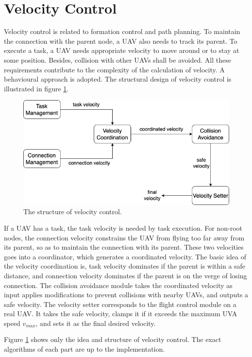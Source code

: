 \section{Velocity Control}

Velocity control is related to formation control and path planning.
To maintain the connection with the parent node,
a UAV also needs to track its parent.
To execute a task,
a UAV needs appropriate velocity to move around or to stay at some position.
Besides, collision with other UAVs shall be avoided.
All these requirements contribute to the complexity of the calculation of velocity.
A behavioural approach is adopted.
The structural design of velocity control is illustrated in figure \ref{fig:v_ctrl}.

\begin{figure}[htbp]
  \centering
  \includegraphics[width=0.8\linewidth]{rsc/velocity_control_structure.png}
  \caption
  {The structure of velocity control.}
  \label{fig:v_ctrl}
\end{figure}

If a UAV has a task, the task velocity is needed by task execution.
For non-root nodes,
the connection velocity constrains the UAV from flying too far away from its parent,
so as to maintain the connection with its parent.
These two velocities goes into a coordinator, which generates a coordinated velocity.
The basic idea of the velocity coordination is,
task velocity dominates if the parent is within a safe distance,
and connection velocity dominates if the parent is on the verge of losing connection.
The collision avoidance module takes the coordinated velocity as input
applies modifications to prevent collisions with nearby UAVs,
and outputs a safe velocity.
The velocity setter corresponds to the flight control module on a real UAV.
It takes the safe velocity,
clamps it if it exceeds the maximum UVA speed $v_{max}$,
and sets it as the final desired velocity.

Figure \ref{fig:v_ctrl} shows only the idea and structure of velocity control.
The exact algorithms of each part are up to the implementation.

